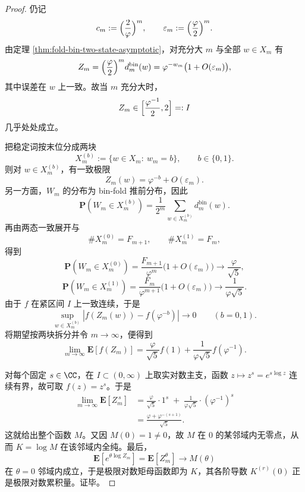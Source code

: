 \begin{proof}
仍记
\[
c_m:=\Bigl(\frac{2}{\varphi}\Bigr)^m,
\qquad
\varepsilon_m:=\Bigl(\frac{\varphi}{2}\Bigr)^m.
\]
由定理 \ref{thm:fold-bin-two-state-asymptotic}，对充分大 \(m\) 与全部 \(w\in X_m\) 有
\[
Z_m
=
\Bigl(\frac{\varphi}{2}\Bigr)^m d_m^{\mathrm{bin}}(w)
=
\varphi^{-w_m}\bigl(1+O(\varepsilon_m)\bigr),
\]
其中误差在 \(w\) 上一致。故当 \(m\) 充分大时，
\[
Z_m\in \Bigl[\frac{\varphi^{-1}}{2},2\Bigr]=:I
\]
几乎处处成立。

把稳定词按末位分成两块
\[
X_m^{(b)}:=\{w\in X_m:\ w_m=b\},
\qquad b\in\{0,1\}.
\]
则对 \(w\in X_m^{(b)}\)，有一致极限
\[
Z_m(w)=\varphi^{-b}+O(\varepsilon_m).
\]
另一方面，\(W_m\) 的分布为 bin-fold 推前分布，因此
\[
\mathbf P(W_m\in X_m^{(b)})
=
\frac{1}{2^m}\sum_{w\in X_m^{(b)}}d_m^{\mathrm{bin}}(w).
\]
再由两态一致展开与
\[
\#X_m^{(0)}=F_{m+1},
\qquad
\#X_m^{(1)}=F_m,
\]
得到
\[
\mathbf P(W_m\in X_m^{(0)})
=
\frac{F_{m+1}}{\varphi^m}\bigl(1+O(\varepsilon_m)\bigr)
\longrightarrow
\frac{\varphi}{\sqrt5},
\]
\[
\mathbf P(W_m\in X_m^{(1)})
=
\frac{F_m}{\varphi^{m+1}}\bigl(1+O(\varepsilon_m)\bigr)
\longrightarrow
\frac{1}{\varphi\sqrt5}.
\]
由于 \(f\) 在紧区间 \(I\) 上一致连续，于是
\[
\sup_{w\in X_m^{(b)}}|f(Z_m(w))-f(\varphi^{-b})|\longrightarrow 0
\qquad(b=0,1).
\]
将期望按两块拆分并令 \(m\to\infty\)，便得到
\[
\lim_{m\to\infty}\mathbf E[f(Z_m)]
=
\frac{\varphi}{\sqrt5}f(1)+\frac{1}{\varphi\sqrt5}f(\varphi^{-1}).
\]

对每个固定 \(s\in\CC\)，在 \(I\subset(0,\infty)\) 上取实对数主支，函数 \(z\mapsto z^s=e^{s\log z}\) 连续有界，故可取 \(f(z)=z^s\)。于是
\[
\begin{aligned}
\lim_{m\to\infty}\mathbf E[Z_m^{\,s}]
&=
\frac{\varphi}{\sqrt5}\cdot 1^s
\;+\;
\frac{1}{\varphi\sqrt5}\cdot (\varphi^{-1})^s\\
&=
\frac{\varphi+\varphi^{-(s+1)}}{\sqrt5}.
\end{aligned}
\]
这就给出整个函数 \(M\)。又因 \(M(0)=1\neq 0\)，故 \(M\) 在 \(0\) 的某邻域内无零点，从而 \(K=\log M\) 在该邻域内全纯。最后，
\[
\mathbf E[e^{\theta\log Z_m}]=\mathbf E[Z_m^\theta]\longrightarrow M(\theta)
\]
在 \(\theta=0\) 邻域内成立，于是极限对数矩母函数即为 \(K\)，其各阶导数 \(K^{(r)}(0)\) 正是极限对数累积量。证毕。
\end{proof}

